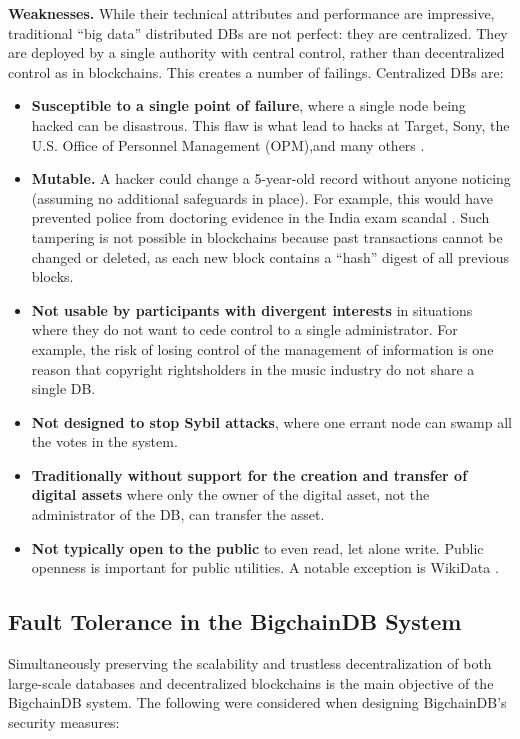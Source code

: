 \medskip
\noindent\textbf{Weaknesses.} While their technical attributes and performance are impressive, traditional “big data” distributed DBs are not perfect: they are centralized.
They are deployed by a single authority with central control, rather than decentralized control as in blockchains.
This creates a number of failings.
Centralized DBs are:
\begin{itemize}
  \item \textbf{Susceptible to a single point of failure}, where a single node being hacked can be disastrous. This flaw is what lead to hacks at Target, Sony, the U.S. Office of Personnel Management (OPM),and many others \cite{bluestone2014sony_hack, davis2015hacking}.
  \item \textbf{Mutable.} A hacker could change a 5-year-old record without anyone noticing (assuming no additional safeguards in place). For example, this would have prevented police from doctoring evidence in the India exam scandal \cite{sethy2015india_scam}. Such tampering is not possible in blockchains because past transactions cannot be changed or deleted, as each new block contains a “hash” digest of all previous blocks.
  \item \textbf{Not usable by participants with divergent interests} in situations where they do not want to cede control to a single administrator. For example, the risk of losing control of the management of information is one reason that copyright rightsholders in the music industry do not share a single DB.
  \item \textbf{Not designed to stop Sybil attacks}, where one errant node can swamp all the votes in the system.
  \item \textbf{Traditionally without support for the creation and transfer of digital assets} where only the owner of the digital asset, not the administrator of the DB, can transfer the asset.
  \item \textbf{Not typically open to the public} to even read, let alone write. Public openness is important for public utilities. A notable exception is WikiData \cite{wikidata}.
\end{itemize}

\subsection{Fault Tolerance in the BigchainDB System}

Simultaneously preserving the scalability and trustless decentralization of both large-scale databases and decentralized blockchains is the main objective of the BigchainDB system. The following were considered when designing BigchainDB's security measures:

